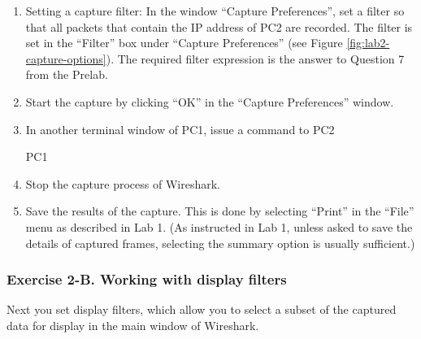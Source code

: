 \begin{enumerate}
\begin{minipage}{\linewidth}
			\label{fig:lab2-capture-options}
		\end{minipage}
	\item Setting a capture filter: In the window ``Capture Preferences'', set a filter so that all packets that contain the IP address of PC2 are recorded. The filter is set in the ``Filter'' box under ``Capture Preferences'' (see Figure \ref{fig:lab2-capture-options}). The required filter expression is the answer to Question 7 from the Prelab.
	\item Start the capture by clicking ``OK'' in the ``Capture Preferences'' window.
	\item In another terminal window of PC1, issue a  command to PC2
		\begin{cmdblock}
	PC1%
		\end{cmdblock}
	\item Stop the capture process of Wireshark.
	\item Save the results of the capture. This is done by selecting ``Print'' in the ``File'' menu as described in Lab 1. (As instructed in Lab 1, unless asked to save the details of captured frames, selecting the summary option is usually sufficient.)
\end{enumerate}


\subsubsection*{Exercise 2-B. Working with display filters}

Next you set display filters, which allow you to select a subset of the captured data for display in the main window of Wireshark.

